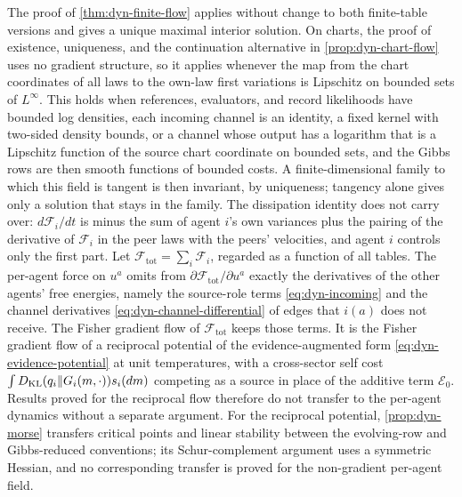 The proof of \cref{thm:dyn-finite-flow} applies without change to both finite-table versions and gives a unique maximal interior solution. On charts, the proof of existence, uniqueness, and the continuation alternative in \cref{prop:dyn-chart-flow} uses no gradient structure, so it applies whenever the map from the chart coordinates of all laws to the own-law first variations is Lipschitz on bounded sets of $L^\infty$. This holds when references, evaluators, and record likelihoods have bounded log densities, each incoming channel is an identity, a fixed kernel with two-sided density bounds, or a channel whose output has a logarithm that is a Lipschitz function of the source chart coordinate on bounded sets, and the Gibbs rows are then smooth functions of bounded costs. A finite-dimensional family to which this field is tangent is then invariant, by uniqueness; tangency alone gives only a solution that stays in the family. The dissipation identity does not carry over: $d\mathcal F_i/dt$ is minus the sum of agent $i$'s own variances plus the pairing of the derivative of $\mathcal F_i$ in the peer laws with the peers' velocities, and agent $i$ controls only the first part. Let $\mathcal F_{\mathrm{tot}}=\sum_i\mathcal F_i$, regarded as a function of all tables. The per-agent force on $u^a$ omits from $\partial\mathcal F_{\mathrm{tot}}/\partial u^a$ exactly the derivatives of the other agents' free energies, namely the source-role terms \cref{eq:dyn-incoming} and the channel derivatives \cref{eq:dyn-channel-differential} of edges that $i(a)$ does not receive. The Fisher gradient flow of $\mathcal F_{\mathrm{tot}}$ keeps those terms. It is the Fisher gradient flow of a reciprocal potential of the evidence-augmented form \cref{eq:dyn-evidence-potential} at unit temperatures, with a cross-sector self cost $\int D_{\mathrm{KL}}(q_i\Vert G_i(m,\cdot))s_i(dm)$ competing as a source in place of the additive term $\mathcal E_0$. Results proved for the reciprocal flow therefore do not transfer to the per-agent dynamics without a separate argument. For the reciprocal potential, \cref{prop:dyn-morse} transfers critical points and linear stability between the evolving-row and Gibbs-reduced conventions; its Schur-complement argument uses a symmetric Hessian, and no corresponding transfer is proved for the non-gradient per-agent field.

